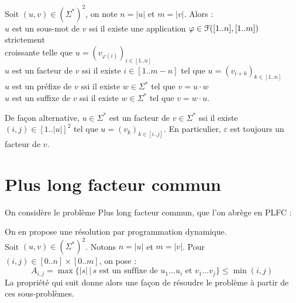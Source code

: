 \begin{Rappel}
	Soit \((u,v)\in(\Sigma^*)^2\), on note \(n=|u|\) et \(m=|v|\). Alors : \\
		 \bdot \(u\) est un sous-mot de \(v\) ssi il existe une application \(\varphi\in\EuScript{F}([1..n],[1..m])\) strictement \\  croissante telle que \(u = (v_{\varphi(i)})_{i\in[1..n]}\) \\
		 \bdot \(u\) est un facteur de \(v\) ssi il existe \(i\in[1..m-n]\) tel que \(u = (v_{i+k})_{k\in[1..n]}\) \\
		 \bdot \(u\) est un préfixe de \(v\) ssi il existe \(w\in\Sigma^*\) tel que \(v = u\cdot w\) \\
		 \bdot \(u\) est un suffixe de \(v\) ssi il existe \(w\in\Sigma^*\) tel que \(v = w\cdot u\).
\end{Rappel}

\begin{Remarque}
	De façon alternative, \(u\in\Sigma^*\) est un facteur de \(v \in \Sigma^*\) ssi il existe \((i,j)\in[1..|u|]^2\) tel que \(u = (v_k)_{k\in[i..j]}\). En particulier, \(\varepsilon\) est toujours un facteur de \(v\).
\end{Remarque}

\pagebreak
\section{Plus long facteur commun}
	
	On considère le problème \textsf{Plus long facteur commun}, que l'on abrège en \textsf{PLFC} :
	\begin{center}
	\end{center}
	\eqskip{2mm}
	On en propose une résolution par programmation dynamique. \\
	Soit \((u,v)\in(\Sigma^*)^2\). Notons \(n=|u|\) et \(m=|v|\). \nt
	Pour \((i,j)\in[0..n]\times[0..m]\), on pose :
			\[
				A_{i,j} = \max\{|s| \,|\, \text{\(s\) est un suffixe de \(u_1...u_i\) et \(v_1...v_j\)}\} \leq \min(i,j)
			\]
	La propriété qui suit donne alors une façon de résoudre le problème à partir de ces sous-problèmes.
			
